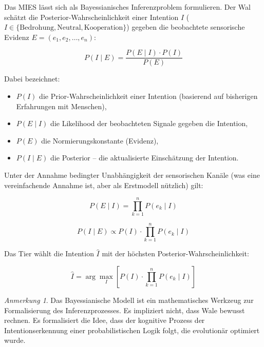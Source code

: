 ﻿\documentclass[12pt,a4paper]{article}
\theoremstyle{definition}
\theoremstyle{remark}
\newtheorem{anmerkung}{Anmerkung}[section]
\begin{document}
Das MIES lässt sich als Bayessianisches Inferenzproblem formulieren.
Der Wal schätzt die Posterior-Wahrscheinlichkeit einer Intention $I$
($I \in \{\text{Bedrohung}, \text{Neutral}, \text{Kooperation}\}$)
gegeben die beobachtete sensorische Evidenz $E = (e_1, e_2, \ldots, e_n)$:

\begin{equation}
  P(I \mid E) = \frac{P(E \mid I) \cdot P(I)}{P(E)}
  \label{eq:bayes}
\end{equation}

Dabei bezeichnet:
\begin{itemize}
  \item $P(I)$ die Prior-Wahrscheinlichkeit einer Intention (basierend auf
        bisherigen Erfahrungen mit Menschen),
  \item $P(E \mid I)$ die Likelihood der beobachteten Signale gegeben
        die Intention,
  \item $P(E)$ die Normierungskonstante (Evidenz),
  \item $P(I \mid E)$ die Posterior -- die aktualisierte Einschätzung
        der Intention.
\end{itemize}

Unter der Annahme bedingter Unabhängigkeit der sensorischen Kanäle
(was eine vereinfachende Annahme ist, aber als Erstmodell nützlich) gilt:

\begin{equation}
  P(E \mid I) = \prod_{k=1}^{n} P(e_k \mid I)
  \label{eq:likelihood}
\end{equation}

\begin{equation}
  P(I \mid E) \propto P(I) \cdot \prod_{k=1}^{n} P(e_k \mid I)
  \label{eq:posterior}
\end{equation}

Das Tier wählt die Intention $\hat{I}$ mit der höchsten Posterior-Wahrscheinlichkeit:

\begin{equation}
  \hat{I} = \arg\max_{I} \left[ P(I) \cdot \prod_{k=1}^{n} P(e_k \mid I) \right]
  \label{eq:map}
\end{equation}

\begin{anmerkung}
  Das Bayessianische Modell ist ein mathematisches Werkzeug zur Formalisierung
  des Inferenzprozesses. Es impliziert nicht, dass Wale bewusst rechnen.
  Es formalisiert die Idee, dass der kognitive Prozess der Intentionserkennung
  einer probabilistischen Logik folgt, die evolutionär optimiert wurde.
\end{anmerkung}
\end{document}
